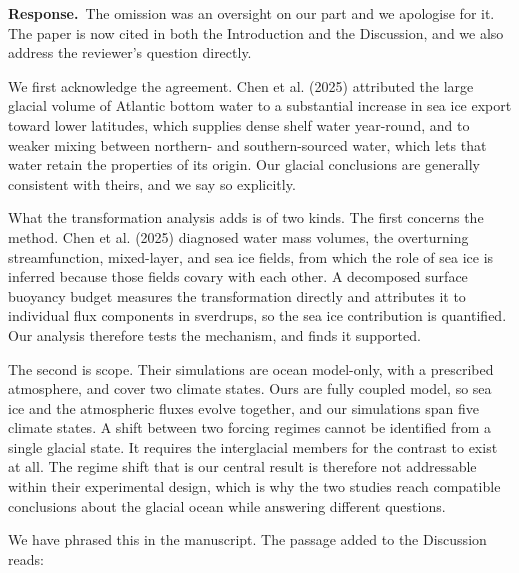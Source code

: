 \documentclass[11pt,a4paper]{article}
\newcommand{\response}{\par\noindent\color{chgcol}\textbf{Response.}\ }
\begin{document}
\response The omission was an oversight on our part and we apologise for it. The paper is now cited in both the Introduction and the Discussion, and we also address the reviewer's question directly.

We first acknowledge the agreement. Chen et al. (2025) attributed the large glacial volume of Atlantic bottom water to a substantial increase in sea ice export toward lower latitudes, which supplies dense shelf water year-round, and to weaker mixing between northern- and southern-sourced water, which lets that water retain the properties of its origin. Our glacial conclusions are generally consistent with theirs, and we say so explicitly.

What the transformation analysis adds is of two kinds. The first concerns the method. Chen et al. (2025) diagnosed water mass volumes, the overturning streamfunction, mixed-layer, and sea ice fields, from which the role of sea ice is inferred because those fields covary with each other. A decomposed surface buoyancy budget measures the transformation directly and attributes it to individual flux components in sverdrups, so the sea ice contribution is quantified. Our analysis therefore tests the mechanism, and finds it supported.

The second is scope. Their simulations are ocean model-only, with a prescribed atmosphere, and cover two climate states. Ours are fully coupled model, so sea ice and the atmospheric fluxes evolve together, and our simulations span five climate states. A shift between two forcing regimes cannot be identified from a single glacial state. It requires the interglacial members for the contrast to exist at all. The regime shift that is our central result is therefore not addressable within their experimental design, which is why the two studies reach compatible conclusions about the glacial ocean while answering different questions.

We have phrased this in the manuscript. The passage added to the Discussion reads:
\end{document}
